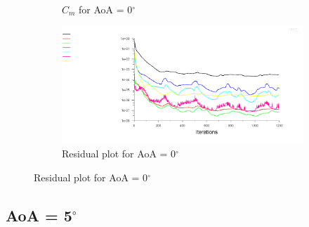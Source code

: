 \begin{figure}[H]
\begin{subfigure}[b]{0.5\textwidth}
    \caption{$C_m$ for AoA = 0$^\circ$}
    \label{fig:aoa_0_cm}
  \end{subfigure}
  \begin{subfigure}[b]{0.5\textwidth}
    \includegraphics[width=\textwidth]{0_deg/AoA_0_resid.png}
    \caption{Residual plot for AoA = 0$^\circ$}
    \label{fig:aoa_0_resid}
  \end{subfigure}
\end{figure}

\subsection*{AoA = 5$^\circ$}

